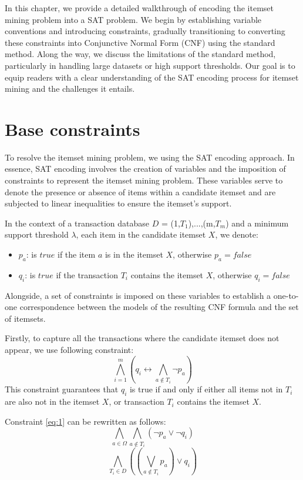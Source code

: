In this chapter, we provide a detailed walkthrough of encoding the itemset mining problem into a SAT problem.
We begin by establishing variable conventions and introducing constraints, gradually transitioning to converting these constraints into Conjunctive Normal Form (CNF) using the standard method.
Along the way, we discuss the limitations of the standard method, particularly in handling large datasets or high support thresholds.
Our goal is to equip readers with a clear understanding of the SAT encoding process for itemset mining and the challenges it entails.

\section{Base constraints}
To resolve the itemset mining problem, we using the SAT encoding approach.
In essence, SAT encoding involves the creation of variables and the imposition of constraints to represent the itemset mining problem.
These variables serve to denote the presence or absence of items within a candidate itemset and are subjected to linear inequalities to ensure the itemset's support.

In the context of a transaction database $D$ = {(1,$T_1$),...,(m,$T_m$)} and a minimum support threshold $\lambda$,
each item in the candidate itemset $X$, we denote:
\begin{itemize}
    \item $p_a$: is $true$ if the item $a$ is in the itemset $X$, otherwise $p_a = false$
    \item $q_i$: is $true$ if the transaction $T_i$ contains the itemset $X$, otherwise $q_i = false$
\end{itemize}
Alongside, a set of constraints is imposed on these variables to establish a one-to-one correspondence between the models of the resulting CNF formula and the set of itemsets.

Firstly, to capture all the transactions where the candidate itemset does not appear, we use following constraint:
\begin{equation}
    \label{eq:1}
    \bigwedge_{i=1}^{m} (q_i \leftrightarrow \bigwedge_{a \notin T_i} \neg p_a)
\end{equation}
This constraint guarantees that $q_i$ is true if and only if either all items not in $T_i$ are also not in the itemset $X$, or transaction $T_i$ contains the itemset $X$.

Constraint \ref{eq:1} can be rewritten as follows:
\begin{equation}
    \label{eq:2}
    \bigwedge_{a \in \Omega} \bigwedge_{a \notin T_i} (\neg p_a \vee \neg q_i)
\end{equation}
\begin{equation}
    \label{eq:3}
    \bigwedge_{T_i \in D} ((\bigvee_{a \notin T_i} p_a) \vee q_i)
\end{equation}


